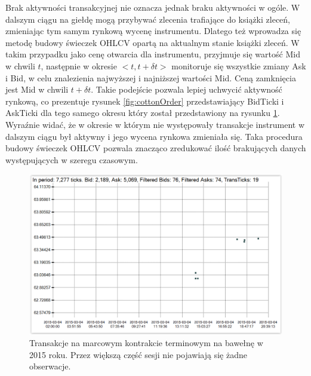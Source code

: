 \documentclass[a4paper,12pt,openany, DIV=calc, headsepline]{scrbook}
\begin{document}
Brak aktywności transakcyjnej nie oznacza jednak braku aktywności w ogóle. W dalszym ciągu na giełdę mogą przybywać zlecenia trafiające do książki zleceń, zmieniając tym samym rynkową wycenę instrumentu. Dlatego też wprowadza się metodę budowy świeczek OHLCV opartą na aktualnym stanie książki zleceń. W takim przypadku jako cenę otwarcia dla instrumentu, przyjmuje się wartość Mid w chwili $t$, następnie w okresie $<t,t + \delta t>$ monitoruje się wszystkie zmiany Ask i Bid, w celu znalezienia najwyższej i najniższej wartości Mid. Ceną zamknięcia jest Mid w chwili $t + \delta t$. Takie podejście pozwala lepiej uchwycić aktywność rynkową, co prezentuje rysunek \ref{fig:cottonOrder} przedstawiający BidTicki i AskTicki dla tego samego okresu który został przedstawiony na rysunku \ref{fig:cottonTrans}. Wyraźnie widać, że w okresie w którym nie występowały transakcje instrument w dalszym ciągu był aktywny i jego wycena rynkowa zmieniała się. Taka procedura budowy świeczek OHLCV pozwala znacząco zredukować ilość brakujących danych występujących w szeregu czasowym. 


\begin{figure}[H]
  \centering
  \includegraphics[scale=0.5]{wykresy/cottonTickH.PNG}
  \caption{Transakcje na marcowym kontrakcie terminowym na bawełnę w 2015 roku. Przez większą część sesji nie pojawiają się żadne obserwacje.}
  \label{fig:cottonTrans}
\end{figure}
\end{document}
